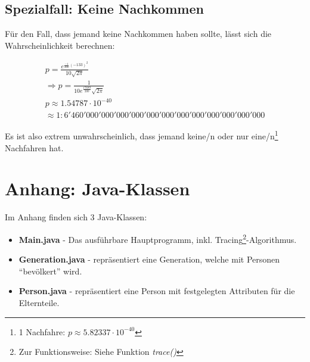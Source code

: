 \documentclass[a4paper,10pt,headlines=3.2]{scrartcl}
\newcommand*\f[1] {\textbf{#1}}
\begin{document}
\subsection{Spezialfall: Keine Nachkommen}
Für den Fall, dass jemand keine Nachkommen haben sollte, lässt sich die Wahrscheinlichkeit berechnen:

\begin{eqnarray}
p = \frac{e^{\frac{-1}{200} (-133)^2}}{10 \sqrt{2 \pi}} \\
\Rightarrow p = \frac{1}{10 e^{\frac{17689}{200}} \sqrt{2\pi}}\\
p\approx 1.54787\cdot 10^{-40} \\
\approx 1 : 6'460'000'000'000'000'000'000'000'000'000'000'000'000
\end{eqnarray}

Es ist also extrem unwahrscheinlich, dass jemand keine/n oder nur eine/n\footnote{1 Nachfahre: $p \approx 5.82337\cdot 10^{-40}$} Nachfahren hat.

\section{Anhang: Java-Klassen}
Im Anhang finden sich 3 Java-Klassen:
\begin{itemize}
 \item \f{Main.java} - Das ausführbare Hauptprogramm, inkl. Tracing\footnote{Zur Funktionsweise: Siehe Funktion \textit{trace()}}-Algorithmus.
 \item \f{Generation.java} - repräsentiert eine Generation, welche mit Personen ``bevölkert'' wird.
 \item \f{Person.java} - repräsentiert eine Person mit festgelegten Attributen für die Elternteile. 
\end{itemize}




\end{document}
